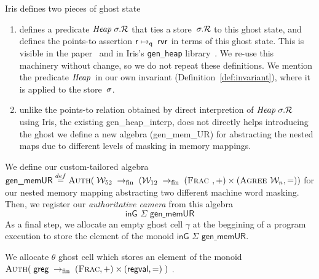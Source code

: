 \begin{assumption}
\label{assumption}
Iris defines two pieces of ghost state
\begin{enumerate}
\item  defines a predicate $\mathit{Heap}\;\sigma.\mathcal{R}$
  that ties a store~$\sigma.\mathcal{R}$ to this ghost state,
  and defines the points-to assertion $\mathsf{r}\mapsto_{\mathsf{q}}\;\mathsf{rv}\mathsf{r}$
  in terms of this ghost state.
  This is visible in the paper~\cite[\S6.3.2]{iris}
  and in Iris's \texttt{gen\_heap} library~\cite{genheap}.
  We re-use this machinery without change,
  so we do not repeat these definitions.
  We mention the predicate $\mathit{Heap}\;\!$
  in our own invariant (Definition~\ref{def:invariant}),
  where it is applied to the \logical store~$\sigma$.
\item unlike the points-to relation obtained by direct interpretion of $\mathit{Heap}\;\sigma.\mathcal{R}$ using Iris, the existing \textsf{gen\_heap\_interp},
  does not directly helps introducing the ghost we define a new algebra (\textsf{gen\_mem\_UR}) for abstracting the nested maps due to different levels of masking in memory mappings. 
\end{enumerate}
\end{assumption}

\begin{definition}
We define our custom-tailored algebra 
\newcommand\fpfn{\rightarrow_{\textrm{fin}}}
\( \textsf{gen\_memUR} \stackrel{def}{=}
  \authm(\;
  \Locft \;\fpfn\;
  (\Loctw \;\fpfn\;  (\textsc{Frac }, \mathord{+}) \times (\textsc{Agree } \Loc,\mathord{=}) )
  \)
  for our nested memory mapping abstracting two different machine word masking. Then, we register our \emph{authoritative camera} \cite[\S6.3.3]{iris} from this algebra
\[\textsf{inG } \Sigma \textsf{ gen\_memUR} \]
As a final step, we allocate an empty ghost cell $\gamma$ at the beggining of a program execution to store the element of the monoid $\textsf{inG } \Sigma \textsf{ gen\_memUR}$.
\end{definition}

\begin{definition}
We allocate $\theta$ ghost cell which stores an
element of the monoid 
\newcommand\fpfn{\rightarrow_{\textrm{fin}}}
\(
  \authm(\;
    \regset \;\fpfn\;
    (\textsc{Frac}, \mathord{+})
    \times
    (\regvaltype, \mathord{=})
  \;)
\)
\cite[\S6.3.3]{iris}.
\end{definition}

